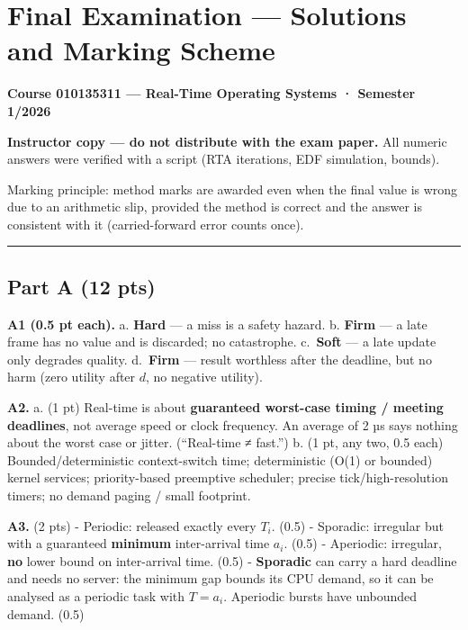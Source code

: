 \documentclass[
  11pt,
]{article}
\author{}
\date{}
\begin{document}
\section{Final Examination --- Solutions and Marking
Scheme}\label{final-examination-solutions-and-marking-scheme}

\textbf{Course 010135311 --- Real-Time Operating Systems · Semester
1/2026}

\textbf{Instructor copy --- do not distribute with the exam paper.} All
numeric answers were verified with a script (RTA iterations, EDF
simulation, bounds).

Marking principle: method marks are awarded even when the final value is
wrong due to an arithmetic slip, provided the method is correct and the
answer is consistent with it (carried-forward error counts once).

\begin{center}\rule{0.5\linewidth}{0.5pt}\end{center}

\subsection{Part A (12 pts)}\label{part-a-12-pts}

\textbf{A1 (0.5 pt each).} a. \textbf{Hard} --- a miss is a safety
hazard. b. \textbf{Firm} --- a late frame has no value and is discarded;
no catastrophe. c.~\textbf{Soft} --- a late update only degrades
quality. d.~\textbf{Firm} --- result worthless after the deadline, but
no harm (zero utility after \(d\), no negative utility).

\textbf{A2.} a. (1 pt) Real-time is about \textbf{guaranteed worst-case
timing / meeting deadlines}, not average speed or clock frequency. An
average of 2 µs says nothing about the worst case or jitter.
(``Real-time ≠ fast.'') b. (1 pt, any two, 0.5 each)
Bounded/deterministic context-switch time; deterministic (O(1) or
bounded) kernel services; priority-based preemptive scheduler; precise
tick/high-resolution timers; no demand paging / small footprint.

\textbf{A3.} (2 pts) - Periodic: released exactly every \(T_i\). (0.5) -
Sporadic: irregular but with a guaranteed \textbf{minimum} inter-arrival
time \(a_i\). (0.5) - Aperiodic: irregular, \textbf{no} lower bound on
inter-arrival time. (0.5) - \textbf{Sporadic} can carry a hard deadline
and needs no server: the minimum gap bounds its CPU demand, so it can be
analysed as a periodic task with \(T = a_i\). Aperiodic bursts have
unbounded demand. (0.5)
\end{document}
